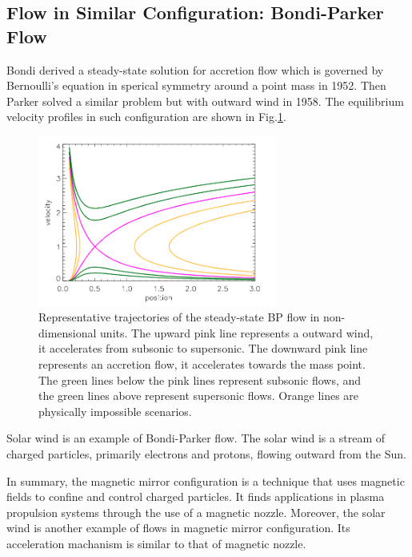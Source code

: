 \subsection{Flow in Similar Configuration: Bondi-Parker Flow}
Bondi derived a steady-state solution for accretion flow which is governed by Bernoulli's equation in sperical symmetry around a point mass in 1952. Then Parker solved a similar problem but with outward wind in 1958. \cite{aikawa_stability_1979, bondi_spherically_1952,keto_stability_2020} The equilibrium velocity profiles in such configuration are shown in Fig.\ref{fig:BP-flow-velocity}.

\begin{figure}[htbp]
    \centering
    \includegraphics[width=0.7\textwidth]{img/introduction/steady-state-BP-flow}
    \caption{Representative trajectories of the steady-state BP flow in non-dimensional units. \cite{keto_stability_2020} The upward pink line represents a outward wind, it accelerates from subsonic to supersonic. The downward pink line represents an accretion flow, it accelerates towards the mass point. The green lines below the pink lines represent subsonic flows, and the green lines above represent supersonic flows. Orange lines are physically impossible scenarios.}
    \label{fig:BP-flow-velocity}
\end{figure}

Solar wind is an example of Bondi-Parker flow. The solar wind is a stream of charged particles, primarily electrons and protons, flowing outward from the Sun. 

In summary, the magnetic mirror configuration is a technique that uses magnetic fields to confine and control charged particles. It finds applications in plasma propulsion systems through the use of a magnetic nozzle. Moreover, the solar wind is another example of flows in magnetic mirror configuration. Its acceleration machanism is similar to that of magnetic nozzle. 

